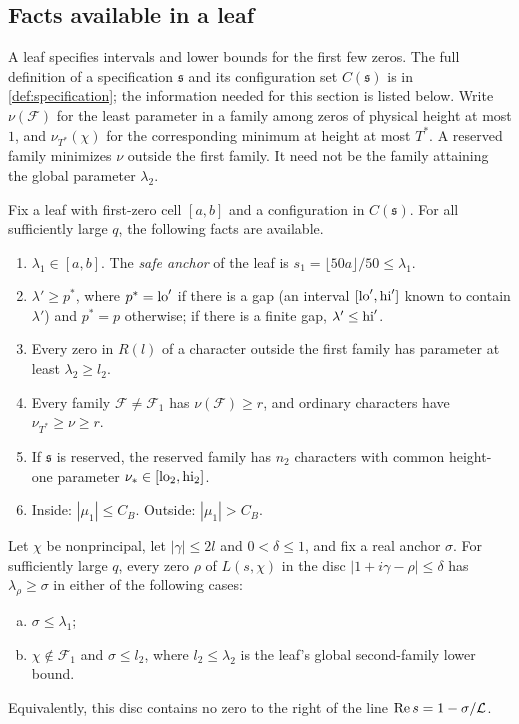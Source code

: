 \subsection{Facts available in a leaf}\label{subsec:leaffacts}
A leaf specifies intervals and lower bounds for the first few zeros. The full definition
of a specification $\mathfrak s$ and its configuration set $C(\mathfrak s)$ is in
\cref{def:specification}; the information needed for this section is listed below.
Write $\nu(\mathcal F)$ for the least parameter in a family among zeros of physical
height at most $1$, and $\nu_{T^*}(\chi)$ for the corresponding minimum at height at
most $T^*$. A reserved family minimizes $\nu$ outside the first family. It need not
be the family attaining the global parameter $\lambda_2$.

Fix a leaf with first-zero cell $[a,b]$ and a configuration in $C(\mathfrak s)$.
For all sufficiently large $q$, the following facts are available.
\begin{enumerate}[(Z1)]
  \item $\lambda_1\in[a,b]$. The \emph{safe anchor} of the leaf is $s_1=\lfloor50a\rfloor/50\le\lambda_1$.
  \item $\lambda'\ge p^*$, where $p^*=\mathrm{lo}'$ if there is a gap (an interval $[\mathrm{lo}',\mathrm{hi}']$ known to
    contain $\lambda'$) and $p^*=p$ otherwise; if there is a finite gap, $\lambda'\le\mathrm{hi}'$.
  \item Every zero in $R(l)$ of a character outside the first family has parameter at least
    $\lambda_2\ge l_2$.
  \item Every family $\mathcal F\ne \mathcal F_1$ has $\nu(\mathcal F)\ge r$, and ordinary characters have $\nu_{T^*}\ge\nu\ge r$.
  \item If $\mathfrak s$ is reserved, the reserved family has $n_2$ characters with common height-one
    parameter $\nu_*\in[\mathrm{lo}_2,\mathrm{hi}_2]$.
  \item Inside: $|\mu_1|\le C_B$. Outside: $|\mu_1|>C_B$.
\end{enumerate}

\begin{lemma}\label{lem:noright}
Let $\chi$ be nonprincipal, let $|\gamma|\le2l$ and $0<\delta\le1$, and fix a real anchor
$\sigma$. For sufficiently large $q$, every zero $\rho$ of $L(s,\chi)$ in the disc
$|1+i\gamma-\rho|\le\delta$ has $\lambda_\rho\ge\sigma$ in either of the following cases:
\begin{enumerate}[(a)]
  \item $\sigma\le\lambda_1$;
  \item $\chi\notin\mathcal F_1$ and $\sigma\le l_2$, where $l_2\le\lambda_2$ is the leaf's
    global second-family lower bound.
\end{enumerate}
Equivalently, this disc contains no zero to the right of the line
$\operatorname{Re} s=1-\sigma/\mathcal{L}$.
\end{lemma}

